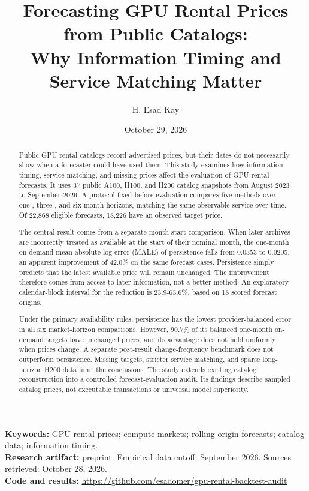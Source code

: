 \documentclass[10pt]{article}
\title{Forecasting GPU Rental Prices from Public Catalogs:\\Why Information Timing and Service Matching Matter}
\author{H. Esad Kay}
\date{October 29, 2026}
\begin{document}
\maketitle
\begin{abstract}

Public GPU rental catalogs record advertised prices, but their dates do not necessarily show when a forecaster could have used them. This study examines how information timing, service matching, and missing prices affect the evaluation of GPU rental forecasts. It uses 37 public A100, H100, and H200 catalog snapshots from August 2023 to September 2026. A protocol fixed before evaluation compares five methods over one-, three-, and six-month horizons, matching the same observable service over time. Of 22,868 eligible forecasts, 18,226 have an observed target price.

The central result comes from a separate month-start comparison. When later archives are incorrectly treated as available at the start of their nominal month, the one-month on-demand mean absolute log error (MALE) of persistence falls from 0.0353 to 0.0205, an apparent improvement of 42.0\% on the same forecast cases. Persistence simply predicts that the latest available price will remain unchanged. The improvement therefore comes from access to later information, not a better method. An exploratory calendar-block interval for the reduction is 23.9-63.6\%, based on 18 scored forecast origins.

Under the primary availability rules, persistence has the lowest provider-balanced error in all six market-horizon comparisons. However, 90.7\% of its balanced one-month on-demand targets have unchanged prices, and its advantage does not hold uniformly when prices change. A separate post-result change-frequency benchmark does not outperform persistence. Missing targets, stricter service matching, and sparse long-horizon H200 data limit the conclusions. The study extends existing catalog reconstruction into a controlled forecast-evaluation audit. Its findings describe sampled catalog prices, not executable transactions or universal model superiority.

\end{abstract}

\noindent\textbf{Keywords:} GPU rental prices; compute markets; rolling-origin forecasts; catalog data; information timing.\\
\noindent\textbf{Research artifact:} preprint. Empirical data cutoff: September 2026. Sources retrieved: October 28, 2026.\\
\noindent\textbf{Code and results:} \url{https://github.com/esadomer/gpu-rental-backtest-audit}\par
\end{document}
